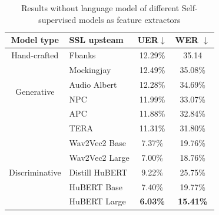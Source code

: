 \begin{table}[ht]
  \centering
  \begin{tabular}{clcc}
  \hline
  Model type                      &  SSL upsteam    & UER$\downarrow$ & WER $\downarrow$ \\ \hline
  Hand-crafted                    & Fbanks         & 12.29\%                                                           & 35.14            \\ \hline
  \multirow{4}{*}{Generative}     & Mockingjay     & 12.49\%                                                           & 35.08\%          \\
                                  & Audio Albert   & 12.28\%                                                           & 34.69\%          \\
                                  & NPC   & 11.99\%                                                           & 33.07\%          \\
                                  & APC            & 11.88\%                                                           & 32.84\%          \\
                                  & TERA           & 11.31\%                                                           & 31.80\%          \\ \hline
  \multirow{5}{*}{Discriminative} & Wav2Vec2 Base  & 7.37\%                                                            & 19.76\%          \\
                                  & Wav2Vec2 Large & 7.00\%                                                            & 18.76\%          \\
                                  & Distill HuBERT & 9.22\%                                                            & 25.75\%          \\
                                  & HuBERT Base    & 7.40\%                                                            & 19.77\%          \\
                                  & HuBERT Large   & \textbf{6.03\%}                                                   & \textbf{15.41\%} \\ \hline
  \end{tabular}
  \caption{Results without language model of different Self-supervised models as feature extractors}
\label{tab:SSL}
  \end{table}

